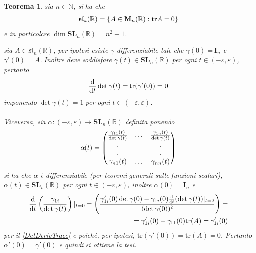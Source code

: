 \documentclass[oneside, 11pt]{amsbook}
\makeatletter
\newcommand{\0}{{(0)}}
\newcommand{\3}{{(3)}}
\theoremstyle{colonplain}
\newtheorem{thm}{Teorema}[chapter]
\theoremstyle{colondefinition}
\theoremstyle{colonremark}
\numberwithin{equation}{chapter}
\renewcommand{\proofname}{Dimostrazione}
\renewenvironment{proof}[1][\proofname]{\par
  \pushQED{\qed}%
  \normalfont \topsep6\p@\@plus6\p@\relax
  \trivlist
  \item[\hskip\labelsep\bfseries #1:]\ignorespaces
}{%
  \popQED\endtrivlist\@endpefalse
}
\makeatother
\begin{document}
\begin{thm} sia $n \in \mathbb{N}$, si ha che
\begin{align}
    \mathfrak{sl}_n(\mathbb{R}) = \{ A \in \mathbf{M}_n(\mathbb{R}) : \mathrm{tr} A = 0 \} \notag
\end{align}
e in particolare $\dim \mathbf{SL}_n(\mathbb{R}) = n^2 - 1$. \\

\begin{proof} sia $A \in \mathfrak{sl}_n(\mathbb{R})$, per ipotesi esiste $\gamma$ differenziabile tale che $\gamma(0) = \mathbf{I}_n$ e $\gamma'(0) = A$. Inoltre deve soddisfare $\gamma(t) \in \mathbf{SL}_n(\mathbb{R})$ per ogni $t \in (-\varepsilon, \varepsilon)$, pertanto
\begin{align}
    \frac{\mathrm{d}}{\mathrm{d}t} \det \gamma(t) = \mathrm{tr} (\gamma'(0)) = 0 \notag
\end{align}
imponendo $\det \gamma(t) = 1$ per ogni $t \in (-\varepsilon, \varepsilon)$. \\ \\
Viceversa, sia $\alpha : (-\varepsilon, \varepsilon) \longrightarrow \mathbf{SL}_n(\mathbb{R})$ definita ponendo
\begin{align}
    \alpha(t) = \begin{pmatrix}
        \frac{\gamma_{11}(t)}{\det \gamma(t)} & \dots & \frac{\gamma_{1n}(t)}{\det \gamma(t)} \\
        . & & . \\
        . & & . \\
        \gamma_{n1}(t) & \dots & \gamma_{nn}(t)
    \end{pmatrix} \notag
\end{align}
si ha che $\alpha$ è differenziabile (per teoremi generali sulle funzioni scalari), \\$\alpha(t) \in \mathbf{SL}_n(\mathbb{R})$ per ogni $t \in (-\varepsilon, \varepsilon)$, inoltre $\alpha(0) = \mathbf{I}_n$ e
\begin{align}
    \frac{\mathrm{d}}{\mathrm{d}t} \left( \frac{\gamma_{1i}}{\det \gamma(t)} \right)|_{t = 0} = \left( \frac{\gamma'_{1i}(0) \det \gamma(0) - \gamma_{1i}(0) \frac{\mathrm{d}}{\mathrm{d}t} (\det \gamma(t))|_{t = 0}}{(\det \gamma(0))^2} \right) = \notag \\
    =  \gamma'_{1i}(0) - \gamma_{11}(0)\mathrm{tr}(A) = \gamma'_{1i}(0) \notag
\end{align}
per il \cref{DetDerivTrace} e poiché, per ipotesi, $\mathrm{tr}(\gamma'(0)) = \mathrm{tr}(A) = 0$. Pertanto $\alpha'(0) = \gamma'(0)$ e quindi si ottiene la tesi. \\ \\

\end{proof}
\end{thm}
\end{document}
